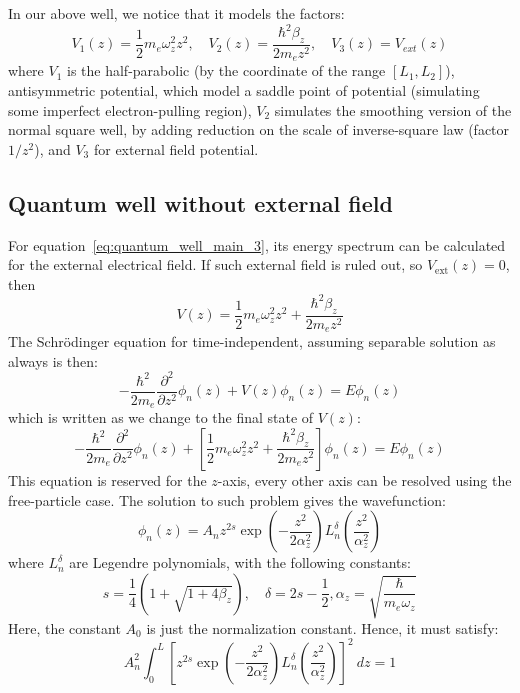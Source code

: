 \documentclass[%
 reprint,
 amsmath,amssymb,
 aps,
]{revtex4-2}
\begin{document}
In our above well, we notice that it models the factors: 
\begin{equation}
    V_{1}(z)=\frac{1}{2} m_{{e}}\omega_{z}^{2}z^{2},\quad V_{2}(z)=\frac{\hbar^{2}\beta_{z}}{2m_{e}z^{2}},\quad V_{3}(z) = V_{ext}(z)
\end{equation}
where $V_{1}$ is the half-parabolic (by the coordinate of the range $[L_{1},L_{2}]$), antisymmetric potential, which model a saddle point of potential (simulating some imperfect electron-pulling region), $V_{2}$ simulates the smoothing version of the normal square well, by adding reduction on the scale of inverse-square law (factor $1/z^{2}$), and $V_{3}$ for external field potential. 
\subsection{Quantum well without external field}
For equation~\ref{eq:quantum_well_main_3}, its energy spectrum can be calculated for the external electrical field. If such external field is ruled out, so $V_{\mathrm{ext}}(z)=0$, then 
\begin{equation}\label{eq:quantum_well_main_2}
    V(z)=\frac{1}{2}m_{{e}}\omega_{z}^{2}z^{2}+ \frac{\hbar^{2}\beta_{z}}{2m_{e}z^{2}} 
\end{equation}
The Schrödinger equation for time-independent, assuming separable solution as always is then:
\begin{equation}
    -\frac{\hbar^{2}}{2m_{e}} \frac{\partial^{2}}{\partial z^{2}} \phi_{n}(z) + V(z)\phi_{n}(z) = E\phi_{n}(z)
\end{equation}
which is written as we change to the final state of $V(z)$:
\begin{equation}
    -\frac{\hbar^{2}}{2m_{e}} \frac{\partial^{2}}{\partial z^{2}} \phi_{n}(z) + \left[\frac{1}{2}m_{{e}}\omega_{z}^{2}z^{2}+ \frac{\hbar^{2}\beta_{z}}{2m_{e}z^{2}}\right]\phi_{n}(z) = E\phi_{n}(z)
\end{equation}
This equation is reserved for the $z$-axis, every other axis can be resolved using the free-particle case. The solution to such problem gives the wavefunction: 
\begin{equation}
    \phi_{n}(z) = A_{n}z^{2s}\exp{\left(-\frac{z^{2}}{2\alpha_{z}^{2}}\right)}L^{\delta}_{n}\left(\frac{z^{2}}{\alpha_{z}^{2}}\right)
\end{equation}
where $L^{\delta}_{n}$ are Legendre polynomials, with the following constants: 
\begin{equation}
    s=\frac{1}{4}\left(1+\sqrt{1+4\beta_{z}}\right), \quad \delta = 2s - \frac{1}{2}, \alpha_{z} = \sqrt{\frac{\hbar}{m_{e}\omega_{z}}}
\end{equation}
Here, the constant $A_{0}$ is just the normalization constant. Hence, it must satisfy: 
\begin{equation}
    A_{n}^{2} \int_{0}^{L} \left[z^{2s}\exp{\left(-\frac{z^{2}}{2\alpha_{z}^{2}}\right)}L^{\delta}_{n}\left(\frac{z^{2}}{\alpha_{z}^{2}}\right)\right]^{2} \: dz = 1
\end{equation}
\end{document}
